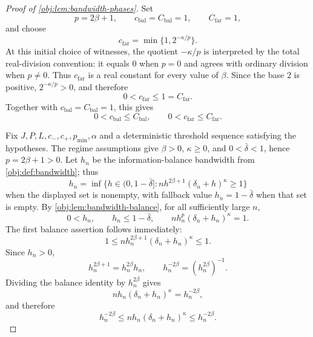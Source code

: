 \begin{proof}[Proof of \cref{obj:lem:bandwidth-phases}]
Set
\[
p=2\beta+1,
\qquad
c_{\mathrm{bal}}=C_{\mathrm{bal}}=1,
\qquad
C_{\mathrm{far}}=1,
\]
and choose
\[
c_{\mathrm{far}}=\min\{1,2^{-\kappa/p}\}.
\]
At this initial choice of witnesses, the quotient \(-\kappa/p\) is interpreted by the total real-division convention: it equals \(0\) when \(p=0\) and agrees with ordinary division when \(p\ne0\). Thus \(c_{\mathrm{far}}\) is a real constant for every value of \(\beta\). Since the base \(2\) is positive, \(2^{-\kappa/p}>0\), and therefore
\[
0<c_{\mathrm{far}}\le1=C_{\mathrm{far}}.
\]
Together with \(c_{\mathrm{bal}}=C_{\mathrm{bal}}=1\), this gives
\[
0<c_{\mathrm{bal}}\le C_{\mathrm{bal}},
\qquad
0<c_{\mathrm{far}}\le C_{\mathrm{far}}.
\]

Fix \(J,P,L,c_-,c_+,p_{\min},\alpha\) and a deterministic threshold sequence satisfying the hypotheses. The regime assumptions give \(\beta>0\), \(\kappa\ge0\), and \(0<\bar\delta<1\), hence \(p=2\beta+1>0\). Let \(h_n\) be the information-balance bandwidth from \cref{obj:def:bandwidth}; thus
\[
h_n=\inf\{h\in(0,1-\bar\delta]:
n h^{2\beta+1}(\delta_n+h)^\kappa\ge1\}
\]
when the displayed set is nonempty, with fallback value \(h_n=1-\bar\delta\) when that set is empty. By \cref{obj:lem:bandwidth-balance}, for all sufficiently large \(n\),
\[
0<h_n,
\qquad
h_n\le1-\bar\delta,
\qquad
n h_n^{p}(\delta_n+h_n)^\kappa=1 .
\]
The first balance assertion follows immediately:
\[
1
\le
n h_n^{2\beta+1}(\delta_n+h_n)^\kappa
\le
1 .
\]
Since \(h_n>0\),
\[
h_n^{2\beta+1}=h_n^{2\beta}h_n,
\qquad
h_n^{-2\beta}=(h_n^{2\beta})^{-1}.
\]
Dividing the balance identity by \(h_n^{2\beta}\) gives
\[
n h_n(\delta_n+h_n)^\kappa=h_n^{-2\beta},
\]
and therefore
\[
h_n^{-2\beta}
\le
n h_n(\delta_n+h_n)^\kappa
\le
h_n^{-2\beta}.
\]


\end{proof}
